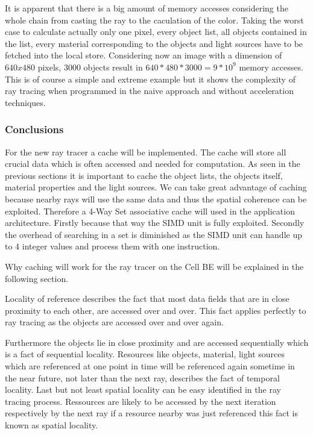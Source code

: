 \documentclass[DIV10, abstracton, openright, footsepline, headsepline, twoside, 9pt,
bigheadings]{scrreprt}
\begin{document}
It is apparent that there is a big amount of memory accesses considering the
whole chain from casting the ray to the caculation of the color. Taking the
worst case to calculate actually only one pixel, every object list, all objects
contained in the list, every material corresponding to the objects and light
sources have to be fetched into the local store. Considering now an image with
a dimension of $640x480$ pixels, $3000$ objects result in
$640 * 480 * 3000 = 9 * 10^9$ memory accesses. This is of course a simple
and extreme example but it shows the complexity of ray tracing when programmed
in the naive approach and without acceleration techniques.

\subsubsection*{Conclusions}
For the new ray tracer a cache will be implemented. The cache will store all
crucial data which is often accessed and needed for computation. As seen in the
previous sections it is important to cache the object lists, the objects
itself, material properties and the light sources. We can take great advantage
of caching because nearby rays will use the same data and thus the spatial
coherence can be exploited. Therefore a 4-Way Set associative cache will
used in the application architecture. Firstly because that way the SIMD unit is
fully exploited. Secondly the overhead of searching in a set is diminished as
the SIMD unit can handle up to 4 integer values and process them with one
instruction.

Why caching will work for the ray tracer on the Cell BE will be explained
in the following section.

Locality of reference
describes the fact that most data fields that  are in close proximity to each
other, are accessed over and over. This fact applies perfectly to ray tracing
 as the objects are accessed over and over again.

Furthermore the objects lie in close proximity and are accessed sequentially
which is a fact of sequential locality. Resources like objects, material, light
sources which are referenced at one point in time will be referenced again
sometime in the near future, not later than the next ray, describes the fact of
temporal locality.
Last but not least spatial locality can be easy identified in the ray tracing
process. Ressources are likely to be accessed by the next iteration  respectively
by the next ray if a resource nearby was just referenced this fact is known as
spatial locality.
\end{document}
